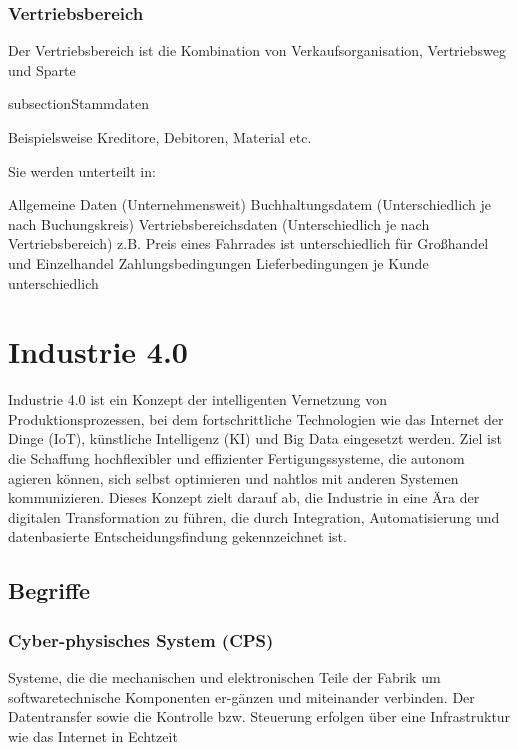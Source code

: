 \documentclass[asp2.tex]{subfiles}
\begin{document}
\subsubsection{Vertriebsbereich}

Der Vertriebsbereich ist die Kombination von Verkaufsorganisation, Vertriebsweg und Sparte

subsection{Stammdaten}

Beispielsweise Kreditore, Debitoren, Material etc.

Sie werden unterteilt in:

\begin{outline}
    \1 Allgemeine Daten (Unternehmensweit)
    \1 Buchhaltungsdatem (Unterschiedlich je nach Buchungskreis)
    \1 Vertriebsbereichsdaten (Unterschiedlich je nach Vertriebsbereich)
        \1 z.B. Preis eines Fahrrades ist unterschiedlich für Großhandel und Einzelhandel
        \1 Zahlungsbedingungen
        \1 Lieferbedingungen je Kunde unterschiedlich
\end{outline}

\section{Industrie 4.0}

Industrie 4.0 ist ein Konzept der intelligenten Vernetzung von Produktionsprozessen, 
bei dem fortschrittliche Technologien wie das Internet der Dinge (IoT), 
künstliche Intelligenz (KI) und Big Data eingesetzt werden. 
Ziel ist die Schaffung hochflexibler und effizienter Fertigungssysteme, 
die autonom agieren können, sich selbst optimieren und nahtlos mit anderen 
Systemen kommunizieren. Dieses Konzept zielt darauf ab, die Industrie in eine 
Ära der digitalen Transformation zu führen, die durch Integration, Automatisierung 
und datenbasierte Entscheidungsfindung gekennzeichnet ist.

\subsection{Begriffe}

\subsubsection{Cyber-physisches System (CPS)}

Systeme, die die mechanischen und elektronischen Teile der Fabrik 
um softwaretechnische Komponenten er-gänzen und miteinander verbinden. 
Der Datentransfer sowie die Kontrolle bzw. Steuerung erfolgen über eine 
Infrastruktur wie das Internet in Echtzeit 
\end{document}
